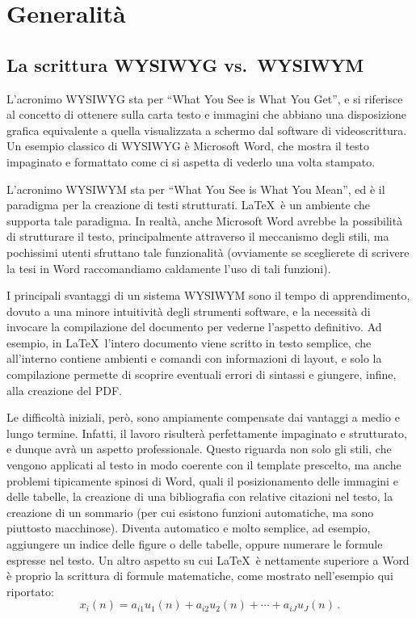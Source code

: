 \documentclass[12pt]{report}
\begin{document}
\section{Generalit\`a}

\subsection{La scrittura WYSIWYG vs.\ WYSIWYM}

L'acronimo WYSIWYG sta per ``What You See is What You Get'', e si riferisce al concetto di ottenere sulla carta testo e immagini che abbiano una disposizione grafica equivalente a quella visualizzata a schermo dal software di videoscrittura. Un esempio classico di WYSIWYG è Microsoft Word, che mostra il testo impaginato e formattato come ci si aspetta di vederlo una volta stampato.

L'acronimo WYSIWYM sta per ``What You See is What You Mean'', ed è il paradigma per la creazione di testi strutturati. \LaTeX\ è un ambiente che supporta tale paradigma. In realtà, anche Microsoft Word avrebbe la possibilità di strutturare il testo, principalmente attraverso il meccanismo degli stili, ma pochissimi utenti sfruttano tale funzionalità (ovviamente se sceglierete di scrivere la tesi in Word raccomandiamo caldamente l'uso di tali funzioni).

I principali svantaggi di un sistema WYSIWYM sono il tempo di apprendimento, dovuto a una minore intuitività degli strumenti software, e la necessità di invocare la compilazione del documento per vederne l'aspetto definitivo. Ad esempio, in \LaTeX\ l'intero documento viene scritto in testo semplice, che all'interno contiene ambienti e comandi con informazioni di layout, e solo la compilazione permette di scoprire eventuali errori di sintassi e giungere, infine, alla creazione del PDF. 

Le difficoltà iniziali, però, sono ampiamente compensate dai vantaggi a medio e lungo termine. Infatti, il lavoro risulterà perfettamente impaginato e strutturato, e dunque avrà un aspetto professionale. Questo riguarda non solo gli stili, che vengono applicati al testo in modo coerente con il template prescelto, ma anche problemi tipicamente spinosi di Word, quali il posizionamento delle immagini e delle tabelle, la creazione di una bibliografia con relative citazioni nel testo, la creazione di un sommario (per cui esistono funzioni automatiche, ma sono piuttosto macchinose). Diventa automatico e molto semplice, ad esempio, aggiungere un indice delle figure o delle tabelle, oppure numerare le formule espresse nel testo. Un altro aspetto su cui \LaTeX\ è nettamente superiore a Word è proprio la scrittura di formule matematiche, come mostrato nell'esempio qui riportato:
\begin{equation}
x_i(n) = a_{i1}u_1(n) + a_{i2}u_2(n) + \cdots + a_{iJ}u_J(n) \, .
\label{eq:multimix}
\end{equation}
\end{document}
